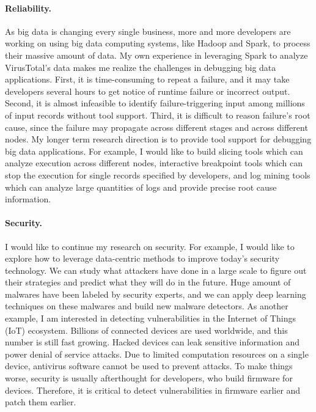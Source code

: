 \documentclass[10pt]{article}
\begin{document}
\vspace{-.1in}
\paragraph{Reliability.} 
As big data is changing every single business, 
more and more developers are working on using big data computing systems, 
like Hadoop and Spark, to process their massive amount of data. 
My own experience in leveraging Spark to analyze VirusTotal's data 
makes me realize the challenges in debugging big data applications. 
First, it is time-consuming to repeat a failure, and it may take developers several hours to get notice of runtime failure or incorrect output.
Second, it is almost infeasible to identify failure-triggering input among millions of input records without tool support. 
Third, it is difficult to reason failure's root cause, since the failure may propagate across different stages and across different nodes. 
My longer term research direction is to provide tool support for debugging big data applications.
For example, I would like to build slicing tools which can analyze execution across different nodes, 
interactive breakpoint tools which can stop the execution for single records specified by developers, 
and log mining tools which can analyze large quantities of logs and provide precise root cause information. 


\vspace{-.1in}
\paragraph{Security.} 
I would like to continue my research on security. 
For example, I would like to explore how to leverage data-centric methods to improve today's security technology. 
We can study what attackers have done in a large scale to figure out their strategies and predict what they will do in the future. 
Huge amount of malwares have been labeled by security experts, and we can apply deep learning techniques on these malwares and build new malware detectors. 
As another example, I am interested in detecting vulnerabilities in the Internet of Things (IoT) ecosystem. 
Billions of connected devices are used worldwide, 
and this number is still fast growing. 
Hacked devices can leak sensitive information and power denial of service attacks. 
Due to limited computation resources on a single device, 
antivirus software cannot be used to prevent attacks. 
To make things worse, security is usually afterthought for developers, who build firmware for devices. 
Therefore, it is critical to detect vulnerabilities in firmware earlier and patch them earlier. 

\newpage


\end{document}

